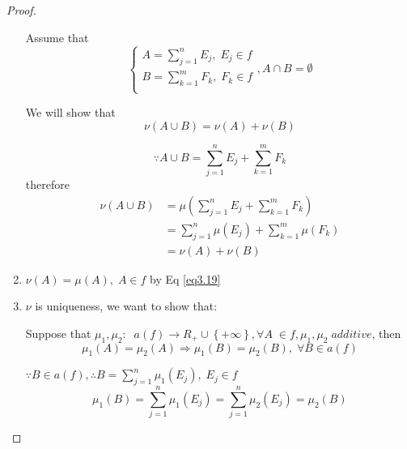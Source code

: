 \begin{proof}
\begin{enumerate}
		Assume that
		\begin{equation}
		\left\{ {\begin{matrix}
			{A = \sum\limits_{j = 1}^n {{E_j}} ,\;{E_j} \in f}  \\ 
			{B = \sum\limits_{k = 1}^m {{F_k}} ,\;{F_k} \in f}  \\ 
			\end{matrix} } \right.,A \cap B = \emptyset 
		\end{equation}
		
		We will show that 
		\begin{equation}
		\nu \left( {A \cup B} \right) = \nu \left( A \right) + \nu \left( B \right)
		\end{equation}
		
		\begin{equation}
		\because A \cup B = \sum\limits_{j = 1}^n {{E_j}}  + \sum\limits_{k = 1}^m {{F_k}} 
		\end{equation}
		therefore 
		\begin{equation}
		\begin{split}
		\nu \left( {A \cup B} \right) & = \mu \left( {\sum\limits_{j = 1}^n {{E_j}}  + \sum\limits_{k = 1}^m {{F_k}} } \right)\\
									  & = \sum\limits_{j = 1}^n {\mu \left( {{E_j}} \right) + \sum\limits_{k = 1}^m {\mu \left( {{F_k}} \right)} } \\
									  & = \nu \left( A \right) + \nu \left( B \right)
		\end{split}
		\end{equation}
		\item $\nu \left( A \right) = \mu \left( A \right),\;A \in f$ by Eq \ref{eq3.19}
		
		\item $ \nu $ is uniqueness, we want to show that:
		
		Suppose that ${\mu _1},{\mu _2}:\;\;a\left( f \right) \to {R_ + } \cup \left\{ { + \infty } \right\},\forall A\; \in f,{\mu _1},{\mu _2}\;additive$,  then
		\begin{equation}
		{\mu _1}\left( A \right) = {\mu _2}\left( A \right) \Rightarrow {\mu _1}\left( B \right) = {\mu _2}\left( B \right),\;\forall B \in a\left( f \right)
		\end{equation}
		
		$ \because B \in a\left(f\right), \therefore B = \sum\limits_{j = 1}^n {{\mu _1}\left( {{E_j}} \right)} ,\;{E_j} \in f $ 
		\begin{equation}
		{\mu _1}\left( B \right) = \sum\limits_{j = 1}^n {{\mu _1}\left( {{E_j}} \right)}  = \sum\limits_{j = 1}^n {{\mu _2}\left( {{E_j}} \right)}  = {\mu _2}\left( B \right)
		\end{equation}
	\end{enumerate}


\end{proof}
